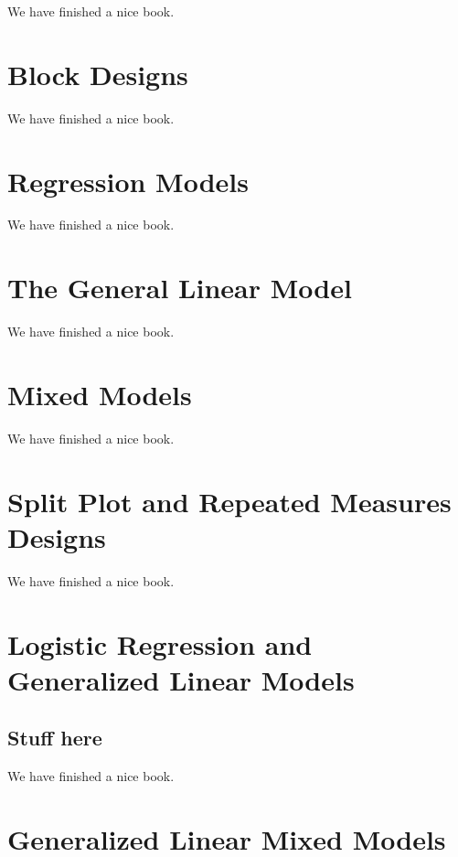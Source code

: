 \documentclass[]{book}
\begin{document}
We have finished a nice book.

\hypertarget{block}{%
\chapter{Block Designs}\label{block}}

We have finished a nice book.

\hypertarget{regression}{%
\chapter{Regression Models}\label{regression}}

We have finished a nice book.

\hypertarget{glm}{%
\chapter{The General Linear Model}\label{glm}}

We have finished a nice book.

\hypertarget{mixedmodels}{%
\chapter{Mixed Models}\label{mixedmodels}}

We have finished a nice book.

\hypertarget{repeatedmeasures}{%
\chapter{Split Plot and Repeated Measures Designs}\label{repeatedmeasures}}

We have finished a nice book.

\hypertarget{logistic}{%
\chapter{Logistic Regression and Generalized Linear Models}\label{logistic}}

\hypertarget{stuff-here}{%
\section{Stuff here}\label{stuff-here}}

We have finished a nice book.

\hypertarget{glmm}{%
\chapter{Generalized Linear Mixed Models}\label{glmm}}
\end{document}
